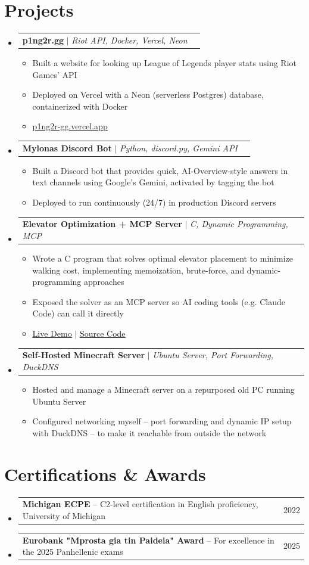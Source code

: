 \documentclass[letterpaper,11pt]{article}
\makeatletter
\newcommand{\resumeItem}[1]{
  \item\small{
    {#1 \vspace{1pt}}
  }
}
\newcommand{\resumeProjectHeading}[2]{
    \item
    \begin{tabular*}{0.97\textwidth}{l@{\extracolsep{\fill}}r}
      \small#1 & #2 \\
    \end{tabular*}\vspace{0pt}
}
\newcommand{\resumeSubHeadingListStart}{\begin{itemize}[leftmargin=0.15in, label={}, itemsep=2pt]}
\newcommand{\resumeSubHeadingListEnd}{\end{itemize}\vspace{0pt}}
\newcommand{\resumeItemListStart}{\begin{itemize}[itemsep=1pt]}
\newcommand{\resumeItemListEnd}{\end{itemize}\vspace{0pt}}
\makeatother
\begin{document}
\section{Projects}
    \resumeSubHeadingListStart
      \resumeProjectHeading
          {\textbf{p1ng2r.gg} $|$ \emph{Riot API, Docker, Vercel, Neon}}{}
          \resumeItemListStart
            \resumeItem{Built a website for looking up League of Legends player stats using Riot Games' API}
            \resumeItem{Deployed on Vercel with a Neon (serverless Postgres) database, containerized with Docker}
            \resumeItem{\href{https://p1ng2r-gg.vercel.app/}{\underline{p1ng2r-gg.vercel.app}}}
          \resumeItemListEnd
      \resumeProjectHeading
          {\textbf{Mylonas Discord Bot} $|$ \emph{Python, discord.py, Gemini API}}{}
          \resumeItemListStart
            \resumeItem{Built a Discord bot that provides quick, AI-Overview-style answers in text channels using Google's Gemini, activated by tagging the bot}
            \resumeItem{Deployed to run continuously (24/7) in production Discord servers}
          \resumeItemListEnd
      \resumeProjectHeading
          {\textbf{Elevator Optimization + MCP Server} $|$ \emph{C, Dynamic Programming, MCP}}{}
          \resumeItemListStart
            \resumeItem{Wrote a C program that solves optimal elevator placement to minimize walking cost, implementing memoization, brute-force, and dynamic-programming approaches}
            \resumeItem{Exposed the solver as an MCP server so AI coding tools (e.g. Claude Code) can call it directly}
            \resumeItem{\href{https://pantsamis.github.io/elevator-optimization/}{\underline{Live Demo}} $|$ \href{https://github.com/PanTsamis/elevator-optimization}{\underline{Source Code}}}
          \resumeItemListEnd
      \resumeProjectHeading
          {\textbf{Self-Hosted Minecraft Server} $|$ \emph{Ubuntu Server, Port Forwarding, DuckDNS}}{}
          \resumeItemListStart
            \resumeItem{Hosted and manage a Minecraft server on a repurposed old PC running Ubuntu Server}
            \resumeItem{Configured networking myself -- port forwarding and dynamic IP setup with DuckDNS -- to make it reachable from outside the network}
          \resumeItemListEnd
    \resumeSubHeadingListEnd


\section{Certifications \& Awards}
    \resumeSubHeadingListStart
      \resumeProjectHeading
          {\textbf{Michigan ECPE} -- C2-level certification in English proficiency, University of Michigan}{2022}
      \resumeProjectHeading
          {\textbf{Eurobank "Mprosta gia tin Paideia" Award} -- For excellence in the 2025 Panhellenic exams}{2025}
    \resumeSubHeadingListEnd
\end{document}
